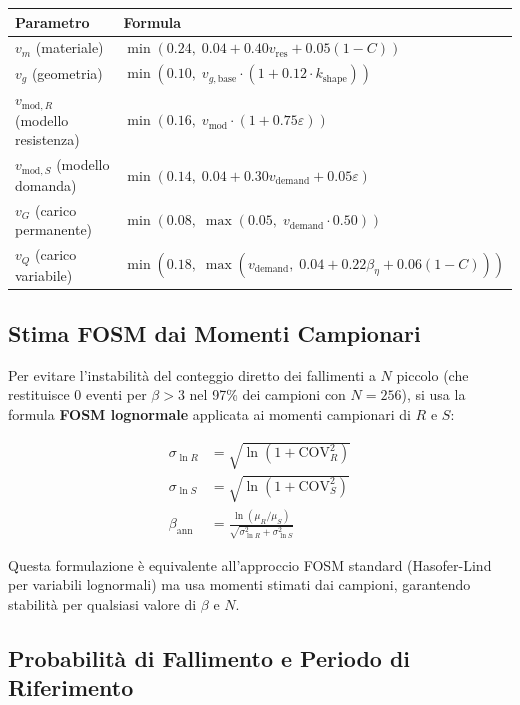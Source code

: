 \documentclass[11pt,a4paper]{article}
\begin{document}
\begin{center}
\begin{tabular}{ll}
\toprule
\textbf{Parametro} & \textbf{Formula} \\
\midrule
$v_m$ (materiale) & $\min(0.24,\; 0.04 + 0.40 v_{\text{res}} + 0.05(1-C))$ \\
$v_g$ (geometria) & $\min(0.10,\; v_{g,\text{base}} \cdot (1 + 0.12 \cdot k_{\text{shape}}))$ \\
$v_{\text{mod},R}$ (modello resistenza) & $\min(0.16,\; v_{\text{mod}} \cdot (1 + 0.75\varepsilon))$ \\
$v_{\text{mod},S}$ (modello domanda) & $\min(0.14,\; 0.04 + 0.30 v_{\text{demand}} + 0.05\varepsilon)$ \\
$v_G$ (carico permanente) & $\min(0.08,\; \max(0.05,\; v_{\text{demand}} \cdot 0.50))$ \\
$v_Q$ (carico variabile) & $\min(0.18,\; \max(v_{\text{demand}},\; 0.04 + 0.22\beta_{\eta} + 0.06(1-C)))$ \\
\bottomrule
\end{tabular}
\end{center}

\subsection{Stima FOSM dai Momenti Campionari}

Per evitare l'instabilità del conteggio diretto dei fallimenti a $N$ piccolo (che restituisce 0 eventi per $\beta > 3$ nel 97\% dei campioni con $N=256$), si usa la formula \textbf{FOSM lognormale} applicata ai momenti campionari di $R$ e $S$:

\begin{align}
  \sigma_{\ln R} &= \sqrt{\ln(1 + \text{COV}_R^2)} \\
  \sigma_{\ln S} &= \sqrt{\ln(1 + \text{COV}_S^2)} \\
  \beta_{\text{ann}} &= \frac{\ln(\mu_R / \mu_S)}{\sqrt{\sigma_{\ln R}^2 + \sigma_{\ln S}^2}}
\end{align}

Questa formulazione \`e equivalente all'approccio FOSM standard (Hasofer-Lind per variabili lognormali) ma usa momenti stimati dai campioni, garantendo stabilit\`a per qualsiasi valore di $\beta$ e $N$.

\subsection{Probabilità di Fallimento e Periodo di Riferimento}
\end{document}
